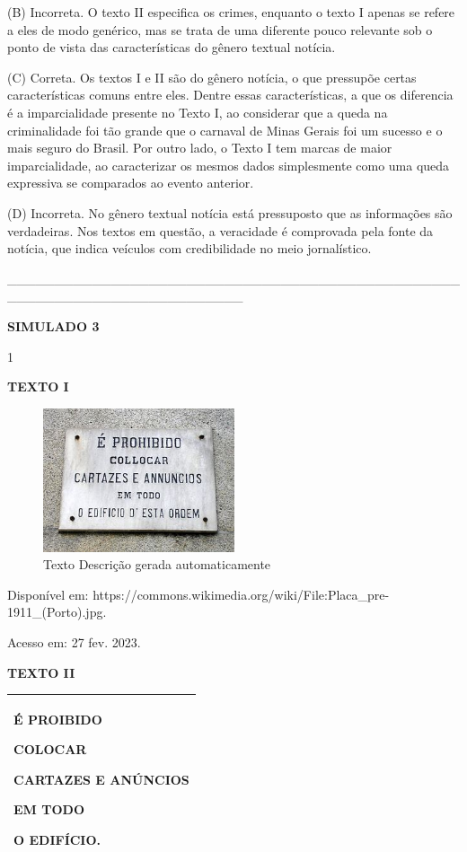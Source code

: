 (B) Incorreta. O texto II especifica os crimes, enquanto o texto I
apenas se refere a eles de modo genérico, mas se trata de uma diferente
pouco relevante sob o ponto de vista das características do gênero
textual notícia.

(C) Correta. Os textos I e II são do gênero notícia, o que pressupõe
certas características comuns entre eles. Dentre essas características,
a que os diferencia é a imparcialidade presente no Texto I, ao
considerar que a queda na criminalidade foi tão grande que o carnaval de
Minas Gerais foi um sucesso e o mais seguro do Brasil. Por outro lado, o
Texto I tem marcas de maior imparcialidade, ao caracterizar os mesmos
dados simplesmente como uma queda expressiva se comparados ao evento
anterior.

(D) Incorreta. No gênero textual notícia está pressuposto que as
informações são verdadeiras. Nos textos em questão, a veracidade é
comprovada pela fonte da notícia, que indica veículos com credibilidade
no meio jornalístico.

\_\_\_\_\_\_\_\_\_\_\_\_\_\_\_\_\_\_\_\_\_\_\_\_\_\_\_\_\_\_\_\_\_\_\_\_\_\_\_\_\_\_\_\_\_\_\_\_\_\_\_\_\_\_\_\_\_\_\_\_\_\_\_\_\_\_\_\_\_\_\_\_\_

\textbf{{SIMULADO 3}}

\num{1}

\textbf{TEXTO I}

\begin{figure}
\centering
\includegraphics[width=2.21875in,height=1.66591in]{./imgSAEB_8_POR/media/image37.jpeg}
\caption{Texto Descrição gerada automaticamente}
\end{figure}

Disponível em:
https://commons.wikimedia.org/wiki/File:Placa\_pre-1911\_(Porto).jpg.

Acesso em: 27 fev. 2023.

\textbf{TEXTO II}

\begin{longtable}[]{@{}l@{}}
\toprule
\endhead
\begin{minipage}[t]{0.30\columnwidth}\raggedright
É PROIBIDO

COLOCAR

CARTAZES E ANÚNCIOS

EM TODO

O EDIFÍCIO.\strut
\end{minipage}\tabularnewline
\bottomrule
\end{longtable}

